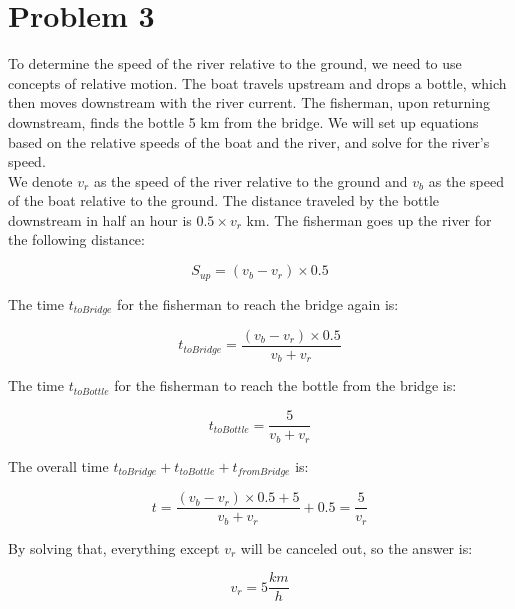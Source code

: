 \section{Problem 3}

\vspace{7mm}

To determine the speed of the river relative to the ground, we need to use concepts of relative motion. The boat travels upstream and drops a bottle, which then moves downstream with the river current. The fisherman, upon returning downstream, finds the bottle 5 km from the bridge. We will set up equations based on the relative speeds of the boat and the river, and solve for the river's speed. \\

We denote \( v_r \) as the speed of the river relative to the ground and \( v_b \) as the speed of the boat relative to the ground. The distance traveled by the bottle downstream in half an hour is \( 0.5 \times v_r \) km. The fisherman goes up the river for the following distance:

\[
S_{up} = (v_b - v_r) \times 0.5
\]

The time \( t_{toBridge} \) for the fisherman to reach the bridge again is:

\[
t_{toBridge} = \frac{(v_b - v_r) \times 0.5}{v_b + v_r}
\]

The time \( t_{toBottle} \) for the fisherman to reach the bottle from the bridge is:

\[
t_{toBottle} = \frac{5}{v_b + v_r}
\]

The overall time \( t_{toBridge} + t_{toBottle} + t_{fromBridge} \) is:

\[
t = \frac{(v_b - v_r) \times 0.5 + 5}{v_b + v_r} + 0.5 = \frac{5}{v_r}
\]

By solving that, everything except $v_r$ will be canceled out, so the answer is:

\[
v_r = \boxed{5 \frac{km}{h}}
\]
